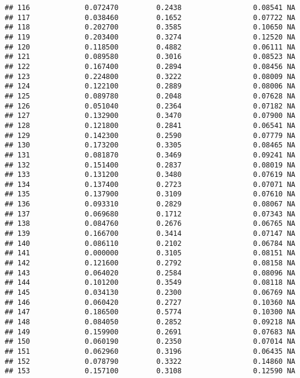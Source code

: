 \documentclass[
]{article}
\begin{document}
\begin{verbatim}
## 116             0.072470         0.2438                 0.08541 NA
## 117             0.038460         0.1652                 0.07722 NA
## 118             0.202700         0.3585                 0.10650 NA
## 119             0.203400         0.3274                 0.12520 NA
## 120             0.118500         0.4882                 0.06111 NA
## 121             0.089580         0.3016                 0.08523 NA
## 122             0.167400         0.2894                 0.08456 NA
## 123             0.224800         0.3222                 0.08009 NA
## 124             0.122100         0.2889                 0.08006 NA
## 125             0.089780         0.2048                 0.07628 NA
## 126             0.051040         0.2364                 0.07182 NA
## 127             0.132900         0.3470                 0.07900 NA
## 128             0.121800         0.2841                 0.06541 NA
## 129             0.142300         0.2590                 0.07779 NA
## 130             0.173200         0.3305                 0.08465 NA
## 131             0.081870         0.3469                 0.09241 NA
## 132             0.151400         0.2837                 0.08019 NA
## 133             0.131200         0.3480                 0.07619 NA
## 134             0.137400         0.2723                 0.07071 NA
## 135             0.137900         0.3109                 0.07610 NA
## 136             0.093310         0.2829                 0.08067 NA
## 137             0.069680         0.1712                 0.07343 NA
## 138             0.084760         0.2676                 0.06765 NA
## 139             0.166700         0.3414                 0.07147 NA
## 140             0.086110         0.2102                 0.06784 NA
## 141             0.000000         0.3105                 0.08151 NA
## 142             0.121600         0.2792                 0.08158 NA
## 143             0.064020         0.2584                 0.08096 NA
## 144             0.101200         0.3549                 0.08118 NA
## 145             0.034130         0.2300                 0.06769 NA
## 146             0.060420         0.2727                 0.10360 NA
## 147             0.186500         0.5774                 0.10300 NA
## 148             0.084050         0.2852                 0.09218 NA
## 149             0.159900         0.2691                 0.07683 NA
## 150             0.060190         0.2350                 0.07014 NA
## 151             0.062960         0.3196                 0.06435 NA
## 152             0.078790         0.3322                 0.14860 NA
## 153             0.157100         0.3108                 0.12590 NA

\end{verbatim}
\end{document}
